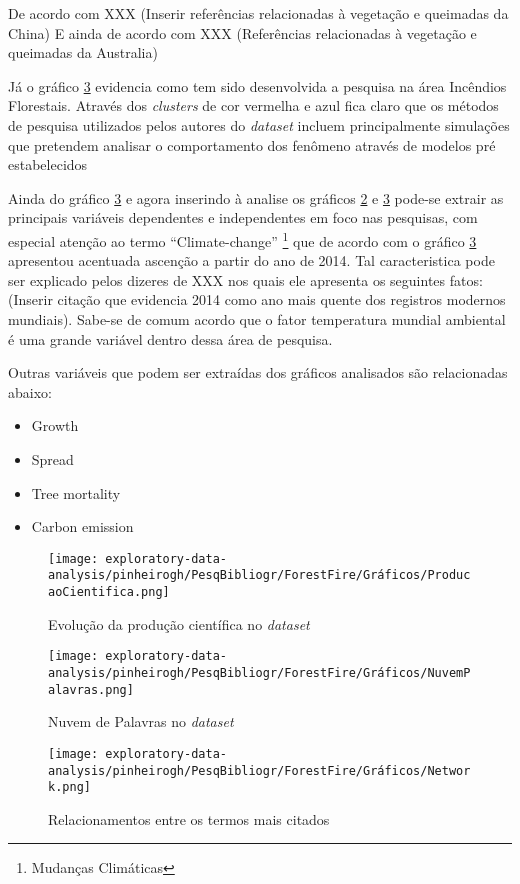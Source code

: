 De acordo com XXX (Inserir referências relacionadas à vegetação e queimadas da China) E ainda de acordo com XXX (Referências relacionadas à vegetação e queimadas da Australia)

Já o gráfico \ref{fig:d} evidencia como tem sido desenvolvida a pesquisa na área Incêndios Florestais. Através dos \textit{clusters} de cor vermelha e azul fica claro que os métodos de pesquisa utilizados pelos autores do \textit{dataset} incluem principalmente simulações que pretendem analisar o comportamento dos fenômeno através de modelos pré estabelecidos  

Ainda do gráfico \ref{fig:d} e agora inserindo à analise os gráficos \ref{fig:b} e \ref{fig:d} pode-se extrair as principais variáveis dependentes e independentes em foco nas pesquisas, com especial atenção ao termo ``Climate-change'' \footnote{Mudanças Climáticas} que de acordo com o gráfico \ref{fig:d} apresentou acentuada ascenção a partir do ano de 2014. Tal caracteristica pode ser explicado pelos dizeres de XXX nos quais ele apresenta os seguintes fatos: (Inserir citação que evidencia 2014 como ano mais quente dos registros modernos mundiais). Sabe-se de comum acordo que o fator temperatura mundial ambiental é uma grande variável dentro dessa área de pesquisa.

Outras variáveis que podem ser extraídas dos gráficos analisados são relacionadas abaixo:
\begin{itemize}
    \item Growth
    \item Spread 
    \item Tree mortality
    \item Carbon emission
\end{itemize}

\begin{figure}[H]
    \centering
    \texttt{[image: exploratory-data-analysis/pinheirogh/PesqBibliogr/ForestFire/Gráficos/ProducaoCientifica.png]}
    \caption{Evolução da produção científica no \textit{dataset}}
    \label{fig:a}
\end{figure}

\begin{figure}[H]
    \centering
    \texttt{[image: exploratory-data-analysis/pinheirogh/PesqBibliogr/ForestFire/Gráficos/NuvemPalavras.png]}
    \caption{Nuvem de Palavras no \textit{dataset}}
    \label{fig:b}
\end{figure}

\begin{figure}[H]
    \centering
    \texttt{[image: exploratory-data-analysis/pinheirogh/PesqBibliogr/ForestFire/Gráficos/Network.png]}
    \caption{Relacionamentos entre os termos mais citados}
    \label{fig:d}
\end{figure}

